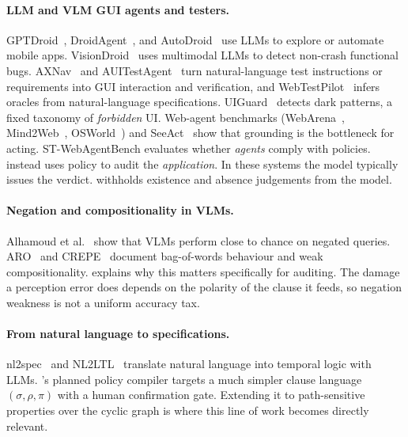\paragraph{LLM and VLM GUI agents and testers.}
GPTDroid~\cite{liu2024gptdroid}, DroidAgent~\cite{yoon2024droidagent}, and
AutoDroid~\cite{wen2024autodroid} use LLMs to explore or automate mobile apps.
VisionDroid~\cite{liu2024visiondroid} uses multimodal LLMs to detect non-crash
functional bugs. AXNav~\cite{taeb2024axnav} and
AUITestAgent~\cite{hu2024auitestagent} turn natural-language test
instructions or requirements into GUI interaction and verification, and
WebTestPilot~\cite{teoh2026webtestpilot} infers oracles from
natural-language specifications. UIGuard~\cite{chen2023uiguard} detects dark
patterns, a fixed taxonomy of \emph{forbidden} UI. Web-agent benchmarks
(WebArena~\cite{zhou2024webarena}, Mind2Web~\cite{deng2023mind2web},
OSWorld~\cite{xie2024osworld}) and SeeAct~\cite{zheng2024seeact} show that
grounding is the bottleneck for acting. ST-WebAgentBench
\cite{levy2026stwebagentbench} evaluates whether \emph{agents} comply with
policies. \sys{} instead uses policy to audit the \emph{application}. In
these systems the model typically issues the verdict. \sys{} withholds
existence and absence judgements from the model.

\paragraph{Negation and compositionality in VLMs.}
Alhamoud et al.~\cite{alhamoud2025negation} show that VLMs perform close to
chance on negated queries. ARO~\cite{yuksekgonul2023aro} and
CREPE~\cite{ma2023crepe} document bag-of-words behaviour and weak
compositionality.  explains why this matters specifically for
auditing. The damage a perception error does depends on the polarity of the
clause it feeds, so negation weakness is not a uniform accuracy tax.

\paragraph{From natural language to specifications.}
nl2spec~\cite{cosler2023nl2spec} and NL2LTL~\cite{fuggitti2023nl2ltl}
translate natural language into temporal logic with LLMs. \sys{}'s planned
policy compiler targets a much simpler clause language
$(\sigma,\rho,\pi)$ with a human confirmation gate. Extending it to
path-sensitive properties over the cyclic graph is where this line of work
becomes directly relevant.
